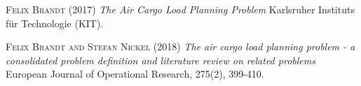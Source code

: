 \documentclass[11pt,a4paper,fleqn]{article}
\begin{document}
	
	
	\pagebreak
	\begin{thebibliography}{9}
	\textsc{Felix Brandt} (2017)
	\textit{The Air Cargo Load Planning Problem}
	Karlsruher Instituts für Technologie (KIT).
	
	\textsc{Felix Brandt and Stefan Nickel} (2018)
	\textit{The air cargo load planning problem - a consolidated problem definition and literature review on related problems}
	European Journal of Operational Research, 275(2), 399-410.
	\end{thebibliography}
	
\end{document}

